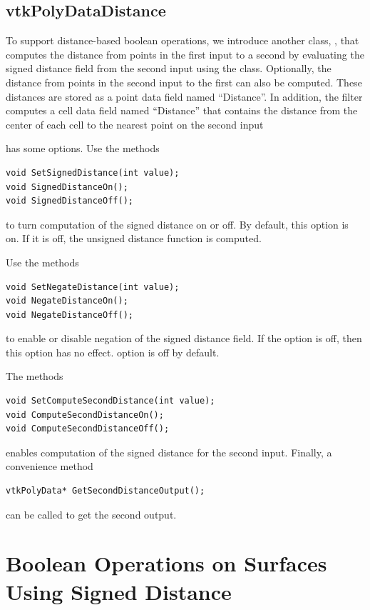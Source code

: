 \documentclass{InsightArticle}
\begin{document}
\subsection{vtkPolyDataDistance}

To support distance-based boolean operations, we introduce another class, , that computes the distance from points in the first input  to a second by evaluating the signed distance field from the second input using the  class. Optionally, the distance from points in the second input  to the first can also be computed. These distances are stored as a point data field named ``Distance''. In addition, the filter computes a cell data field named ``Distance'' that contains the distance from the center of each cell to the nearest point on the second input

 has some options. Use the methods
\begin{verbatim}
void SetSignedDistance(int value);
void SignedDistanceOn();
void SignedDistanceOff();
\end{verbatim}
to turn computation of the signed distance on or off. By default, this option is on. If it is off, the unsigned distance function is computed.

Use the methods
\begin{verbatim}
void SetNegateDistance(int value);
void NegateDistanceOn();
void NegateDistanceOff();
\end{verbatim}
to enable or disable negation of the signed distance field. If the  option is off, then this option has no effect.  option is off by default.

The methods
\begin{verbatim}
void SetComputeSecondDistance(int value);
void ComputeSecondDistanceOn();
void ComputeSecondDistanceOff();
\end{verbatim}
enables computation of the signed distance for the second input. Finally, a convenience method
\begin{verbatim}
vtkPolyData* GetSecondDistanceOutput();
\end{verbatim}
can be called to get the second output.

\section{Boolean Operations on Surfaces Using Signed Distance}
\end{document}
